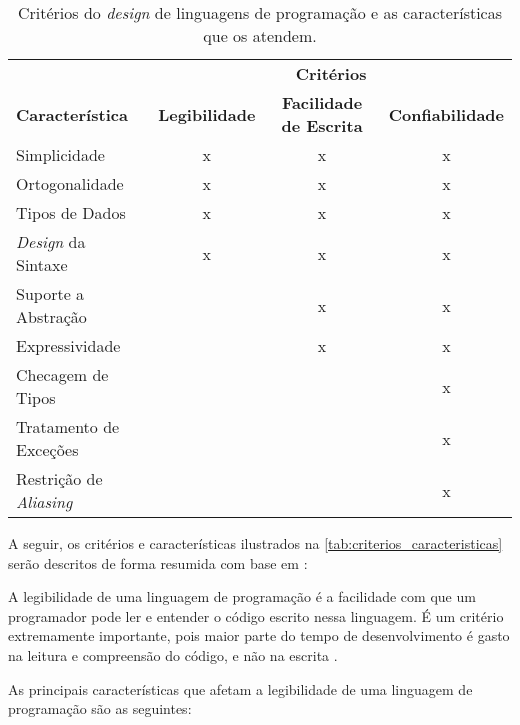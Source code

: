 \begin{table}[h]
	\centering
	\caption{Critérios do \textit{design} de linguagens de programação e as características que os atendem.}
	{
		\begin{tabular}{lccc}
		\hline
		& \multicolumn{3}{c}{\textbf{Critérios}} \\
		\cline{2-4}
		\textbf{Característica} & \textbf{Legibilidade} & \textbf{Facilidade de Escrita} & \textbf{Confiabilidade} \\
		Simplicidade & x & x & x \\
		Ortogonalidade & x & x & x \\
		Tipos de Dados & x & x & x \\
		\textit{Design} da Sintaxe & x & x & x \\
		Suporte a Abstração & & x & x \\
		Expressividade & & x & x \\
		Checagem de Tipos & & & x \\
		Tratamento de Exceções & & & x \\
		Restrição de \textit{Aliasing} & & & x \\
		\hline
		\end{tabular}
	}
	\label{tab:criterios_caracteristicas}
\end{table}

A seguir, os critérios e características ilustrados na \autoref{tab:criterios_caracteristicas} serão descritos de forma resumida com base em :


A legibilidade de uma linguagem de programação é a facilidade com que um programador pode ler e entender o código escrito nessa linguagem. É um critério extremamente importante, pois maior parte do tempo de desenvolvimento é gasto na leitura e compreensão do código, e não na escrita \cite{howdevsspendtime}.

As principais características que afetam a legibilidade de uma linguagem de programação são as seguintes:

